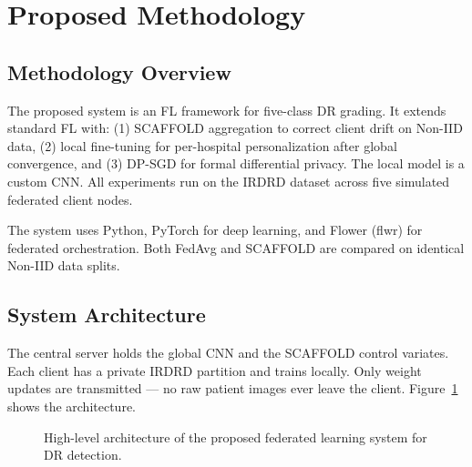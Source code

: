 \documentclass[12pt, a4paper]{article}
\begin{document}
\section{Proposed Methodology}

\subsection{Methodology Overview}

The proposed system is an FL framework for five-class DR grading. It extends standard FL with: (1) SCAFFOLD aggregation to correct client drift on Non-IID data, (2) local fine-tuning for per-hospital personalization after global convergence, and (3) DP-SGD for formal differential privacy. The local model is a custom CNN. All experiments run on the IRDRD dataset across five simulated federated client nodes.

The system uses Python, PyTorch for deep learning, and Flower (flwr) for federated orchestration. Both FedAvg and SCAFFOLD are compared on identical Non-IID data splits.

\subsection{System Architecture}

The central server holds the global CNN and the SCAFFOLD control variates. Each client has a private IRDRD partition and trains locally. Only weight updates are transmitted --- no raw patient images ever leave the client. Figure~\ref{fig:architecture} shows the architecture.

\begin{figure}[H]
\centering
{}
\caption{High-level architecture of the proposed federated learning system for DR detection.}
\label{fig:architecture}
\end{figure}
\end{document}
